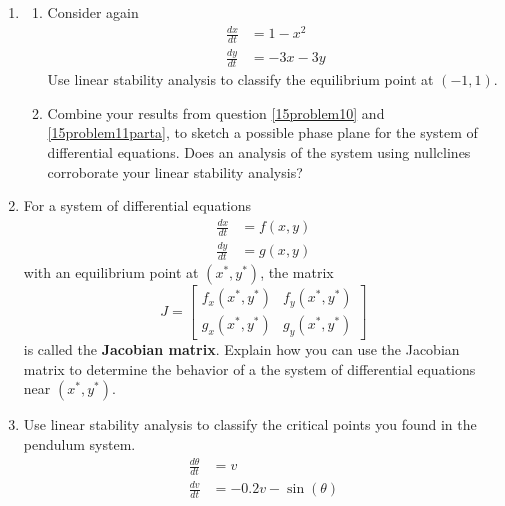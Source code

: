 \begin{enumerate}[resume]
\clearpage

\item \label{15problem11}
\begin{enumerate}
\item Consider again
\begin{align*}
\frac{dx}{dt} &= 1-x^2 \\
\frac{dy}{dt} &= -3x -3y
\end{align*}
Use linear stability analysis to classify the equilibrium point at $(-1,1)$. \label{15problem11parta} \vfill
\item Combine your results from question \ref{15problem10} and \ref{15problem11parta}, to sketch a possible phase plane for the system of differential equations. Does an analysis of the system using nullclines corroborate your linear stability analysis? \label{15problem11partb} \vfill
\end{enumerate}

\clearpage

\item For a system of differential equations
\begin{align*}
\frac{dx}{dt} &= f(x,y) \\
\frac{dy}{dt} &= g(x,y)
\end{align*}
with an equilibrium point at $(x^*,y^*)$, the matrix
\[
J =
\begin{bmatrix}
f_x(x^*,y^*) & f_y(x^*,y^*) \\
g_x(x^*,y^*) & g_y(x^*,y^*)
\end{bmatrix}
\]
is called the \textbf{Jacobian matrix}. Explain how you can use the Jacobian matrix to determine the behavior of a the system of differential equations near $(x^*,y^*)$. \label{15problem12} \vfill

\item Use linear stability analysis to classify the critical points you found in the pendulum system. \label{15problem13}
\begin{align*}
\frac{d\theta}{dt} &=v \\
\frac{dv}{dt} &= -0.2v - \sin(\theta)
\end{align*}
\vfill

\end{enumerate}




